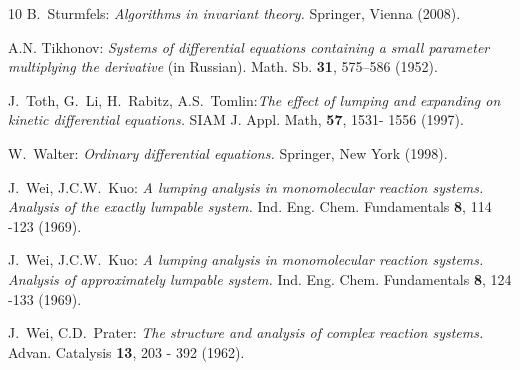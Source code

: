 \documentclass{article}
\begin{document}
\begin{thebibliography}{10}
 B.\ Sturmfels: {\it Algorithms in invariant theory.}
Springer, Vienna (2008).

 A.N. Tikhonov: {\it Systems of differential equations containing 
a small parameter multiplying the derivative} (in Russian).
{Math. Sb.} {\bf31}, 575--586 (1952).

 J.~Toth,  G.~Li, H.~Rabitz, A.S.~Tomlin:{\it The effect of 
lumping and expanding on kinetic differential equations.} SIAM J. Appl. Math, 
{\bf 57}, 1531- 1556 (1997).

 W.~Walter: {\it Ordinary differential equations.}
Springer, New York (1998).

 J.~Wei, J.C.W.~Kuo: {\it A lumping analysis in monomolecular 
reaction systems. Analysis of the exactly lumpable system.} Ind. Eng. Chem. 
Fundamentals {\bf 8}, 114 -123  (1969).

 J.~Wei, J.C.W.~Kuo: {\it A lumping analysis in monomolecular 
reaction systems. Analysis of approximately lumpable system.} Ind. Eng. Chem. 
Fundamentals {\bf 8}, 124 -133  (1969).

 J.~Wei, C.D.~Prater: {\it The structure and analysis of complex 
reaction systems.} Advan. Catalysis {\bf 13}, 203 - 392 (1962).

%
\end{thebibliography}
\end{document}
